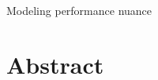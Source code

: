 \documentclass[letterpaper, 12pt]{article}
\begin{document}
{\cmjTitle Modeling performance nuance}
\vspace*{24pt}

\section{Abstract}
\end{document}
